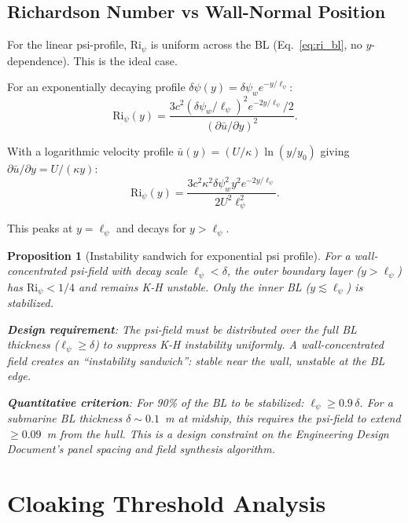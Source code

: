 \documentclass[11pt,twocolumn]{article}
\newcommand{\dpsi}{\delta\psi}
\newcommand{\Ri}{\mathrm{Ri}}
\newtheorem{proposition}{Proposition}
\begin{document}
\subsection{Richardson Number vs Wall-Normal Position}

For the linear psi-profile, $\Ri_\psi$ is uniform across the BL
(Eq.~\eqref{eq:ri_bl}, no $y$-dependence). This is the ideal case.

For an exponentially decaying profile $\dpsi(y) = \dpsi_w e^{-y/\ell_\psi}$:
\begin{equation}
\Ri_\psi(y) = \frac{3c^2(\dpsi_w/\ell_\psi)^2 e^{-2y/\ell_\psi}/2}
{(\partial\bar{u}/\partial y)^2}.
\end{equation}

With a logarithmic velocity profile $\bar{u}(y) = (U/\kappa)\ln(y/y_0)$
giving $\partial\bar{u}/\partial y = U/(\kappa y)$:
\begin{equation}
\Ri_\psi(y) = \frac{3c^2\kappa^2\dpsi_w^2 y^2 e^{-2y/\ell_\psi}}
{2U^2\ell_\psi^2}.
\end{equation}

This peaks at $y = \ell_\psi$ and decays for $y > \ell_\psi$.

\begin{proposition}[Instability sandwich for exponential psi profile]
\label{prop:sandwich}
For a wall-concentrated psi-field with decay scale $\ell_\psi < \delta$,
the outer boundary layer ($y > \ell_\psi$) has $\Ri_\psi < 1/4$ and remains
K-H unstable. Only the inner BL ($y \lesssim \ell_\psi$) is stabilized.

\textbf{Design requirement}: The psi-field must be distributed over the
full BL thickness ($\ell_\psi \geq \delta$) to suppress K-H instability
uniformly. A wall-concentrated field creates an ``instability sandwich'':
stable near the wall, unstable at the BL edge.

\textbf{Quantitative criterion}: For 90\% of the BL to be stabilized:
$\ell_\psi \geq 0.9\,\delta$. For a submarine BL thickness $\delta \sim
0.1$~m at midship, this requires the psi-field to extend $\geq 0.09$~m
from the hull. This is a design constraint on the Engineering Design
Document's panel spacing and field synthesis algorithm.
\end{proposition}

\section{Cloaking Threshold Analysis}
\label{sec:cloaking}
\end{document}
